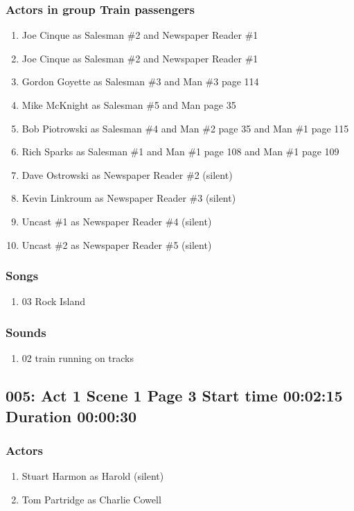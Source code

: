 \subsubsection{Actors in group Train passengers}
\begin{enumerate}
\item Joe Cinque as Salesman \#2 and Newspaper Reader \#1
\item Joe Cinque as Salesman \#2 and Newspaper Reader \#1
\item Gordon Goyette as Salesman \#3 and Man \#3 page 114
\item Mike McKnight as Salesman \#5 and Man page 35
\item Bob Piotrowski as Salesman \#4 and Man \#2 page 35 and Man \#1 page 115
\item Rich Sparks as Salesman \#1 and Man \#1 page 108 and Man \#1 page 109
\item Dave Ostrowski as Newspaper Reader \#2 (silent)
\item Kevin Linkroum as Newspaper Reader \#3 (silent)
\item Uncast \#1 as Newspaper Reader \#4 (silent)
\item Uncast \#2 as Newspaper Reader \#5 (silent)
\end{enumerate}

\subsubsection{Songs}
\begin{enumerate}
\item 03 Rock Island
\end{enumerate}\subsubsection{Sounds}
\begin{enumerate}
\item 02 train running on tracks
\end{enumerate}
\subsection{005: Act 1 Scene 1 Page 3 Start time 00:02:15 Duration 00:00:30}

\subsubsection{Actors}
\begin{enumerate}
\item Stuart Harmon as Harold (silent)
\item Tom Partridge as Charlie Cowell
\end{enumerate}
